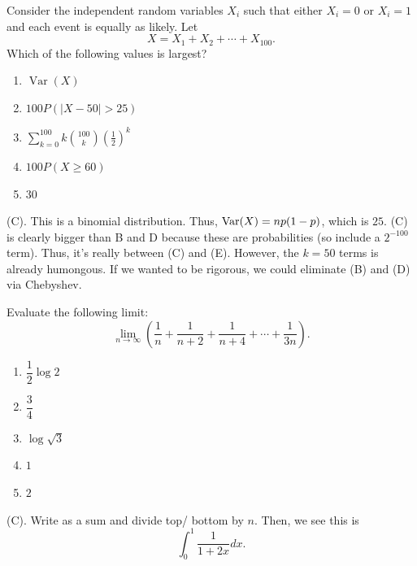 \begin{exercise}
Consider the independent random variables $X_i$ such that either $X_i=0$ or $X_i=1$ and each event is equally as likely. Let
\[
X=X_1+X_2+\cdots+X_{100}.
\]
Which of the following values is largest?

\begin{enumerate}[label=(\Alph*)]
    \item $\operatorname{Var}(X)$
    \item $100P(|X-50|>25)$
    \item $\displaystyle\sum_{k=0}^{100} k\binom{100}{k}\left(\frac12\right)^k$
    \item $100P(X\geq 60)$
    \item $30$
\end{enumerate}
\end{exercise}
\begin{solution}
(C). This is a binomial distribution. Thus, $\operatorname{Var}(X) = np(1-p)$, which is 
$25$. (C) is clearly bigger than B and D because these are probabilities (so include a $2^{-100}$ term).
Thus, it's really between (C) and (E). However, the $k = 50$ terms is already humongous.
If we wanted to be rigorous, we could eliminate (B) and (D) via Chebyshev.
\end{solution}

\begin{exercise}
Evaluate the following limit:
\[
\lim_{n\to\infty}
\left(
\frac{1}{n}
+\frac{1}{n+2}
+\frac{1}{n+4}
+\cdots
+\frac{1}{3n}
\right).
\]

\begin{enumerate}[label=(\Alph*)]
    \item $\dfrac{1}{2}\log 2$
    \item $\dfrac{3}{4}$
    \item $\log\sqrt{3}$
    \item $1$
    \item $2$
\end{enumerate}
\end{exercise}
\begin{solution}
(C). Write as a sum and divide top/ bottom by $n$. Then, we see this is 
\[
\int_0^1 \frac{1}{1 + 2x} dx.
\]
\end{solution}

